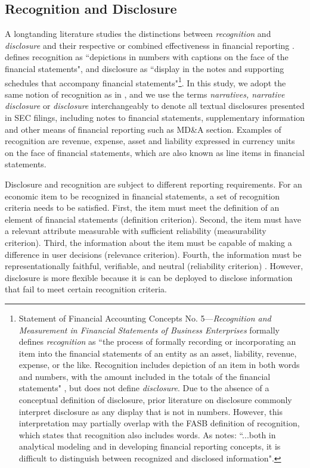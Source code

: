 \documentclass[a4paper]{article}
\begin{document}
\begin{spacing}{2}
\subsection{Recognition and Disclosure}
A longtanding literature studies the distinctions between \textit{recognition} and \textit{disclosure} and their respective or combined effectiveness in financial reporting \citep*{schipperRequiredDisclosuresFinancial2007, barthMarketEffectsRecognition2003, aboodyRecognitionDisclosureOil1996}. \citet[p. 301]{schipperRequiredDisclosuresFinancial2007} defines recognition as ``depictions in numbers with captions on the face of the financial statements", and disclosure as ``display in the notes and supporting schedules that accompany financial statements"\footnote{Statement of Financial Accounting Concepts No. 5---\textit{Recognition and Measurement in Financial Statements of Business Enterprises} formally defines \textit{recognition} as ``the process of formally recording or incorporating an item into the financial statements of an entity as an asset, liability, revenue, expense, or the like. Recognition includes depiction of an item in both words and numbers, with the amount included in the totals of the financial statements" \citep*[par. 6]{fasbStatementFinancialAccounting1984}, but does not define \textit{disclosure}. Due to the absence of a conceptual definition of disclosure, prior literature on disclosure commonly interpret disclosure as any display that is not in numbers. However, this interpretation may partially overlap with the FASB definition of recognition, which states that recognition also includes words. As \citet[p. 302]{schipperRequiredDisclosuresFinancial2007} notes: ``...both in analytical modeling and in developing financial reporting concepts, it is difficult to distinguish between recognized and disclosed information".}. In this study, we adopt the same notion of recognition as in \cite{schipperRequiredDisclosuresFinancial2007}, and we use the terms \textit{narratives, narrative disclosure} or \textit{disclosure} interchangeably to denote all textual disclosures presented in SEC filings, including notes to financial statements, supplementary information and other means of financial reporting such as MD\&A section. Examples of recognition are revenue, expense, asset and liability expressed in currency units on the face of financial statements, which are also known as line items in financial statements. 

Disclosure and recognition are subject to different reporting requirements. For an economic item to be recognized in financial statements, a set of recognition criteria needs to be satisfied. First, the item must meet the definition of an element of financial statements (definition criterion). Second, the item must have a relevant attribute measurable with sufficient reliability (measurability criterion). Third, the information about the item must be capable of making a difference in user decisions (relevance criterion). Fourth, the information must be representationally faithful, verifiable, and neutral (reliability criterion) \citep{fasbStatementFinancialAccounting1984}. However, disclosure is more flexible because it is can be deployed to disclose information that fail to meet certain recognition criteria. 


\end{spacing}
\end{document}
